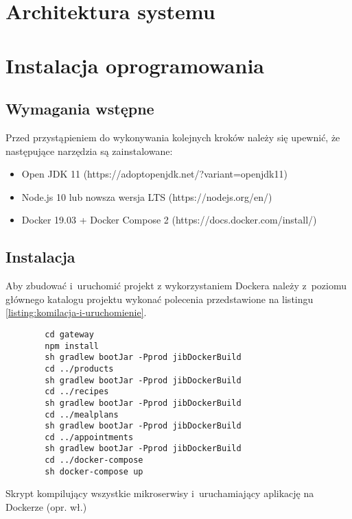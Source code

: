 \section{Architektura systemu}\label{sec:system-architecture}
\section{Instalacja oprogramowania}\label{sec:software-installation}
\subsection{Wymagania wstępne}\label{subsec:prerequirements}
Przed przystąpieniem do wykonywania kolejnych kroków należy się upewnić, że następujące narzędzia są zainstalowane:
\begin{itemize}
    \item Open JDK 11 (https://adoptopenjdk.net/?variant=openjdk11)
    \item Node.js 10 lub nowsza wersja LTS (https://nodejs.org/en/)
    \item Docker 19.03 + Docker Compose 2 (https://docs.docker.com/install/)
\end{itemize}

\subsection{Instalacja}\label{subsec:installation}

Aby zbudować i~uruchomić projekt z wykorzystaniem Dockera należy z~poziomu głównego katalogu projektu
wykonać polecenia przedstawione na listingu \ref{listing:komilacja-i-uruchomienie}.
\begin{listing}[h!]
    \begin{verbatim}
        cd gateway
        npm install
        sh gradlew bootJar -Pprod jibDockerBuild
        cd ../products
        sh gradlew bootJar -Pprod jibDockerBuild
        cd ../recipes
        sh gradlew bootJar -Pprod jibDockerBuild
        cd ../mealplans
        sh gradlew bootJar -Pprod jibDockerBuild
        cd ../appointments
        sh gradlew bootJar -Pprod jibDockerBuild
        cd ../docker-compose
        sh docker-compose up
    \end{verbatim}
    \centering\caption{Skrypt kompilujący wszystkie mikroserwisy i~uruchamiający aplikację na Dockerze (opr. wł.)}\label{listing:komilacja-i-uruchomienie}
\end{listing}

